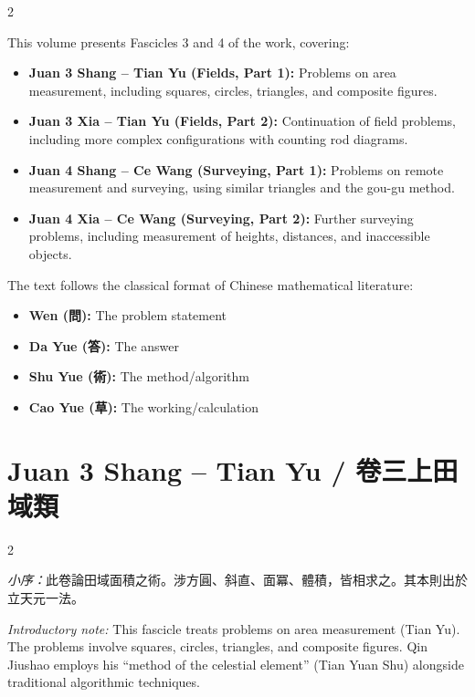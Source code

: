 \documentclass[11pt,a4paper]{article}
\begin{document}
\begin{paracol}{2}
\begin{rightcolumn}
This volume presents Fascicles 3 and 4 of the work, covering:
\begin{itemize}[leftmargin=*,nosep]
  \item \textbf{Juan 3 Shang -- Tian Yu (Fields, Part 1):} Problems on area measurement, 
    including squares, circles, triangles, and composite figures.
  \item \textbf{Juan 3 Xia -- Tian Yu (Fields, Part 2):} Continuation of field problems, 
    including more complex configurations with counting rod diagrams.
  \item \textbf{Juan 4 Shang -- Ce Wang (Surveying, Part 1):} Problems on remote 
    measurement and surveying, using similar triangles and the gou-gu method.
  \item \textbf{Juan 4 Xia -- Ce Wang (Surveying, Part 2):} Further surveying problems, 
    including measurement of heights, distances, and inaccessible objects.
\end{itemize}

The text follows the classical format of Chinese mathematical literature:
\begin{itemize}[leftmargin=*,nosep]
  \item \textbf{Wen (問):} The problem statement
  \item \textbf{Da Yue (答):} The answer
  \item \textbf{Shu Yue (術):} The method/algorithm
  \item \textbf{Cao Yue (草):} The working/calculation
\end{itemize}
\end{rightcolumn}

\end{paracol}

\newpage

\section{Juan 3 Shang -- Tian Yu / 卷三上田域類}
\label{sec:juan3shang}

\begin{paracol}{2}

\begin{leftcolumn*}
\noindent\textit{小序：}此卷論田域面積之術。涉方圓、斜直、面冪、體積，皆相求之。其本則出於立天元一法。
\end{leftcolumn*}

\begin{rightcolumn}
\noindent\textit{Introductory note:} This fascicle treats problems on area 
measurement (Tian Yu). The problems involve squares, circles, triangles, and 
composite figures. Qin Jiushao employs his ``method of the celestial element'' 
(Tian Yuan Shu) alongside traditional algorithmic techniques.
\end{rightcolumn}

\end{paracol}
\end{document}
